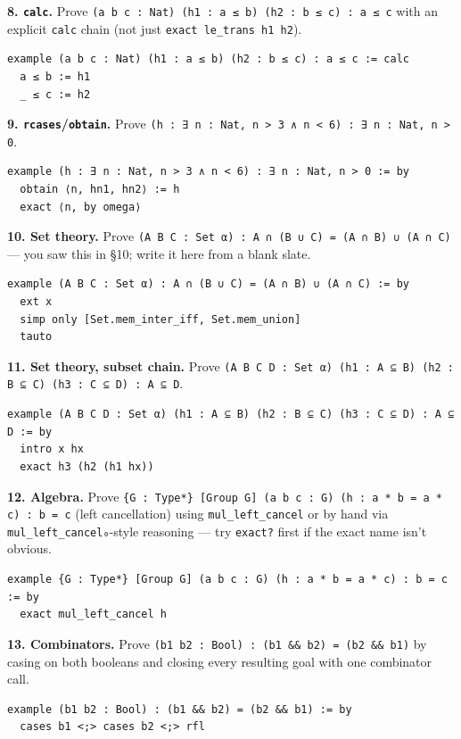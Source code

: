 \textbf{8. \texttt{calc}.} Prove \texttt{(a b c : Nat) (h1 : a ≤ b) (h2 : b ≤ c) : a ≤ c} with an explicit \texttt{calc} chain (not just \texttt{exact le\_trans h1 h2}).

\begin{verbatim}
example (a b c : Nat) (h1 : a ≤ b) (h2 : b ≤ c) : a ≤ c := calc
  a ≤ b := h1
  _ ≤ c := h2
\end{verbatim}

\textbf{9. \texttt{rcases}/\texttt{obtain}.} Prove \texttt{(h : ∃ n : Nat, n > 3 ∧ n < 6) : ∃ n : Nat, n > 0}.

\begin{verbatim}
example (h : ∃ n : Nat, n > 3 ∧ n < 6) : ∃ n : Nat, n > 0 := by
  obtain ⟨n, hn1, hn2⟩ := h
  exact ⟨n, by omega⟩
\end{verbatim}

\textbf{10. Set theory.} Prove \texttt{(A B C : Set α) : A ∩ (B ∪ C) = (A ∩ B) ∪ (A ∩ C)} --- you saw this in \S10; write it here from a blank slate.

\begin{verbatim}
example (A B C : Set α) : A ∩ (B ∪ C) = (A ∩ B) ∪ (A ∩ C) := by
  ext x
  simp only [Set.mem_inter_iff, Set.mem_union]
  tauto
\end{verbatim}

\textbf{11. Set theory, subset chain.} Prove \texttt{(A B C D : Set α) (h1 : A ⊆ B) (h2 : B ⊆ C) (h3 : C ⊆ D) : A ⊆ D}.

\begin{verbatim}
example (A B C D : Set α) (h1 : A ⊆ B) (h2 : B ⊆ C) (h3 : C ⊆ D) : A ⊆ D := by
  intro x hx
  exact h3 (h2 (h1 hx))
\end{verbatim}

\textbf{12. Algebra.} Prove \texttt{\{G : Type*\} [Group G] (a b c : G) (h : a * b = a * c) : b = c} (left cancellation) using \texttt{mul\_left\_cancel} or by hand via \texttt{mul\_left\_cancel₀}-style reasoning --- try \texttt{exact?} first if the exact name isn't obvious.

\begin{verbatim}
example {G : Type*} [Group G] (a b c : G) (h : a * b = a * c) : b = c := by
  exact mul_left_cancel h
\end{verbatim}

\textbf{13. Combinators.} Prove \texttt{(b1 b2 : Bool) : (b1 \&\& b2) = (b2 \&\& b1)} by casing on both booleans and closing every resulting goal with one combinator call.

\begin{verbatim}
example (b1 b2 : Bool) : (b1 && b2) = (b2 && b1) := by
  cases b1 <;> cases b2 <;> rfl
\end{verbatim}


